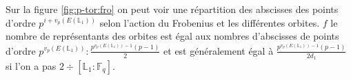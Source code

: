 \documentclass[10pt,a4paper]{book}
\theoremstyle{plain}
\theoremstyle{definition}
\theoremstyle{definition}
\theoremstyle{definition}
\theoremstyle{definition}
\theoremstyle{remark}
\theoremstyle{remark}
\begin{document}

Sur la figure \ref{fig:p-tor:fro} on peut voir une répartition des abscisses des points d'ordre $p^{i+v_p(E(\mathbb{L}_1))}$ selon l'action du Frobenius et les différentes orbites. $f$ le nombre de représentants des orbites est égal aux nombres d'abscisses de points d'ordre $p^{v_p(E(\mathbb{L}_1))}:\frac{p^{v_p(E(\mathbb{L}_1))-1}(p-1)}{2}$ et est généralement égal à $\frac{p^{v_p(E(\mathbb{L}_1))-1}(p-1)}{2d_1}$ si l'on a pas $2 \div [\mathbb{L}_1:\mathbb{F}_q]$.
\end{document}
